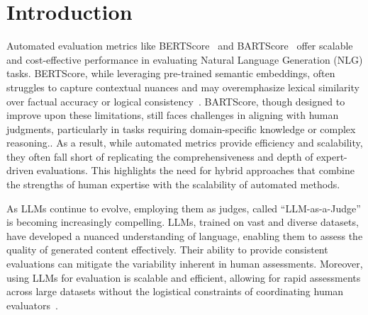 

\section{Introduction}\label{sec:intro}



 Automated evaluation metrics like BERTScore~\cite{zhang2019bertscore} and BARTScore~\cite{yuan2021bartscore} offer scalable and cost-effective performance in evaluating Natural Language Generation (NLG) tasks. BERTScore, while leveraging pre-trained semantic embeddings, often struggles to capture contextual nuances and may overemphasize lexical similarity over factual accuracy or logical consistency~\cite{sellam2020bleurt,sai2022survey}. BARTScore, though designed to improve upon these limitations, still faces challenges in aligning with human judgments, particularly in tasks requiring domain-specific knowledge or complex reasoning.\cite{lu2022toward,liu2023llms}. As a result, while automated metrics provide efficiency and scalability, they often fall short of replicating the comprehensiveness and depth of expert-driven evaluations. This highlights the need for hybrid approaches that combine the strengths of human expertise with the scalability of automated methods.

As LLMs continue to evolve, employing them as judges, called ``LLM-as-a-Judge''  is becoming increasingly compelling. LLMs, trained on vast and diverse datasets, have developed a nuanced understanding of language, enabling them to assess the quality of generated content effectively. Their ability to provide consistent evaluations can mitigate the variability inherent in human assessments. Moreover, using LLMs for evaluation is scalable and efficient, allowing for rapid assessments across large datasets without the logistical constraints of coordinating human evaluators~\cite{dong-etal-2024-llm}.

